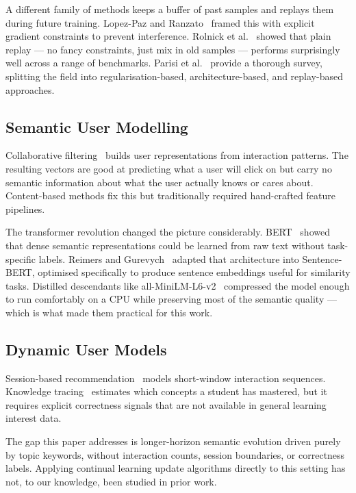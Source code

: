 \documentclass[conference]{IEEEtran}
\begin{document}
A different family of methods keeps a buffer of past samples
and replays them during future training. Lopez-Paz and
Ranzato~\cite{lopezpaz2017} framed this with explicit gradient
constraints to prevent interference. Rolnick et
al.~\cite{rolnick2019} showed that plain replay --- no fancy
constraints, just mix in old samples --- performs surprisingly
well across a range of benchmarks. Parisi et
al.~\cite{parisi2019} provide a thorough survey, splitting the
field into regularisation-based, architecture-based, and
replay-based approaches.

\subsection{Semantic User Modelling}

Collaborative filtering~\cite{koren2009} builds user
representations from interaction patterns. The resulting
vectors are good at predicting what a user will click on but
carry no semantic information about what the user actually
knows or cares about. Content-based methods fix this but
traditionally required hand-crafted feature pipelines.

The transformer revolution changed the picture considerably.
BERT~\cite{devlin2019} showed that dense semantic
representations could be learned from raw text without
task-specific labels. Reimers and
Gurevych~\cite{reimers2019} adapted that architecture into
Sentence-BERT, optimised specifically to produce sentence
embeddings useful for similarity tasks. Distilled descendants
like all-MiniLM-L6-v2~\cite{wang2020} compressed the model
enough to run comfortably on a CPU while preserving most of
the semantic quality --- which is what made them practical
for this work.

\subsection{Dynamic User Models}

Session-based recommendation~\cite{hidasi2016} models
short-window interaction sequences. Knowledge
tracing~\cite{piech2015} estimates which concepts a student
has mastered, but it requires explicit correctness signals
that are not available in general learning interest data.

The gap this paper addresses is longer-horizon semantic
evolution driven purely by topic keywords, without interaction
counts, session boundaries, or correctness labels. Applying
continual learning update algorithms directly to this setting
has not, to our knowledge, been studied in prior work.
\end{document}

